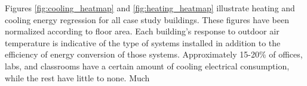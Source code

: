 Figures \ref{fig:cooling_heatmap} and \ref{fig:heating_heatmap} illustrate heating and cooling energy regression for all case study buildings. These figures have been normalized according to floor area. Each building's response to outdoor air temperature is indicative of the type of systems installed in addition to the efficiency of energy conversion of those systems. Approximately 15-20\% of offices, labs, and classrooms have a certain amount of cooling electrical consumption, while the rest have little to none. Much